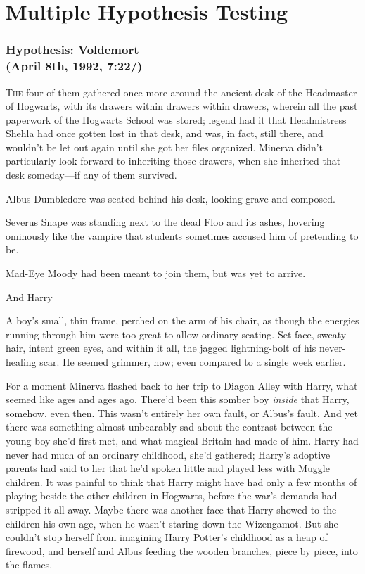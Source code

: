 
\cleartorecto


\chapter{Multiple Hypothesis Testing}

\subsection{Hypothesis: Voldemort\\
(April 8th, 1992, 7:22\PM/)}

\lettrine{T}{he} four of them gathered once more around the ancient desk of the Headmaster
of Hogwarts, with its drawers within drawers within drawers, wherein all the
past paperwork of the Hogwarts School was stored; legend had it that
Headmistress Shehla had once gotten lost in that desk, and was, in fact, still
there, and wouldn't be let out again until she got her files organized. Minerva
didn't particularly look forward to inheriting those drawers, when she
inherited that desk someday---if any of them survived.

Albus Dumbledore was seated behind his desk, looking grave and composed.

Severus Snape was standing next to the dead Floo and its ashes, hovering
ominously like the vampire that students sometimes accused him of pretending to
be.

Mad-Eye Moody had been meant to join them, but was yet to arrive.

And Harry{\el}

A boy's small, thin frame, perched on the arm of his chair, as though the
energies running through him were too great to allow ordinary seating. Set
face, sweaty hair, intent green eyes, and within it all, the jagged
lightning-bolt of his never-healing scar. He seemed grimmer, now; even compared
to a single week earlier.

For a moment Minerva flashed back to her trip to Diagon Alley with Harry, what
seemed like ages and ages ago. There'd been this somber boy \emph{inside} that
Harry, somehow, even then. This wasn't entirely her own fault, or Albus's
fault. And yet there was something almost unbearably sad about the contrast
between the young boy she'd first met, and what magical Britain had made of
him. Harry had never had much of an ordinary childhood, she'd gathered; Harry's
adoptive parents had said to her that he'd spoken little and played less with
Muggle children. It was painful to think that Harry might have had only a few
months of playing beside the other children in Hogwarts, before the war's
demands had stripped it all away. Maybe there was another face that Harry
showed to the children his own age, when he wasn't staring down the Wizengamot.
But she couldn't stop herself from imagining Harry Potter's childhood as a heap
of firewood, and herself and Albus feeding the wooden branches, piece by piece,
into the flames.

